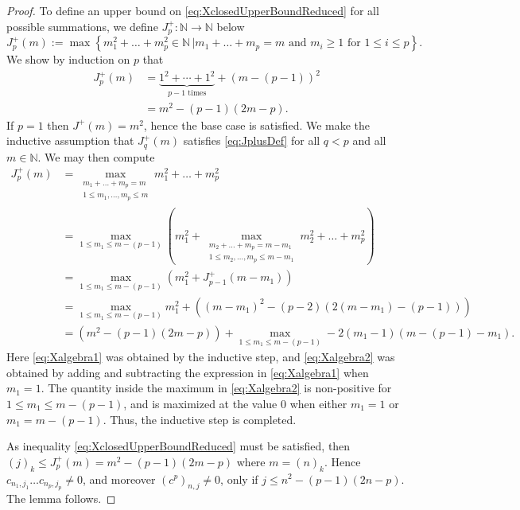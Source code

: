 \documentclass{article}
\newcommand{\N}{\mathbb{N}}
\begin{document}
\begin{proof}
	 To define an upper bound on \eqref{eq:XclosedUpperBoundReduced} for all possible summations, we define   $J^+_p: \N\to \N$  below
	\[
	J^+_p(m) := \max 
	\left\{
	m_1^2  + \dots + m_p^2  \in \N
	\, \Big| 
	m_1 + \dots + m_p = m  \mbox{ and } m_i \geq 1   \mbox{ for } 1 \leq i \leq p
	\right\} .
	\]
	We show by induction on $p$ that
	\begin{align}
J^+_p(m) &= \underbrace{1^2+ \cdots  +1^2}_{p-1 \text{ times} }
+ (m-(p-1))^2
 \nonumber \\
&=m^2 - (p-1)(2m-p) .\label{eq:JplusDef}
	\end{align} 
	If $ p =1$ then $J^+(m) = m^2$, hence the base case is satisfied.  
	We make the inductive assumption that $J^+_q(m)$ satisfies \eqref{eq:JplusDef} for all $ q < p$ and all $ m \in \N$. 
	We may then compute  
\begin{align}
	J_p^+(m) &= \max_{ \substack{m_1 + \dots + m_p =m\\ 1 \leq m_1,\dots , m_p \leq m }} m_1^2 + \dots + m_p^2 
	\nonumber
	\\
		&= 
	\max_{1\leq m_1 \leq m-(p-1) }
	\left( m_1^2 + 
	\max_{\substack{ m_2 + \dots +m_p = m-m_1  \\ 1 \leq m_2 , \dots , m_p \leq m-m_1}}
	m_2^2 + \dots + m_p^2 \right)
	\nonumber
	\\
	&= 
	\max_{1\leq m_1 \leq m-(p-1) }
	\left( m_1^2 + 
	J_{p-1}^+(m-m_1) \right)
	\nonumber
	\\
	&= 
	\max_{1\leq m_1 \leq m-(p-1) } m_1^2 + \left( (m-m_1)^2 -(p-2)( 2(m-m_1) -(p-1)) \right) 
	\label{eq:Xalgebra1}
	\\
	&= \left(
	m^2-(p-1)(2m-p)
	\right) 
	+
	\max_{1\leq m_1 \leq m-(p-1) } 
	-2 (m_1-1)\left( 
	m-(p-1)-m_1
	 \right) .
	 	\label{eq:Xalgebra2}
\end{align}
Here \eqref{eq:Xalgebra1} was obtained by the inductive step,  and \eqref{eq:Xalgebra2} was obtained by adding and subtracting the expression in \eqref{eq:Xalgebra1} when $m_1 = 1$. 
The quantity inside the maximum in \eqref{eq:Xalgebra2} is non-positive for $ 1 \leq m_1 \leq m-(p-1)$, and is maximized at the value $0$ when either $m_1 = 1 $ or $m_1 = m-(p-1)$. Thus, the inductive step is completed. 


As inequality \eqref{eq:XclosedUpperBoundReduced} must be satisfied, then $(j)_k \leq J_p^+(m) = m^2 - (p-1)(2m-p)$ where $m = (n)_k$. 
Hence $	c_{n_1,j_1} \dots c_{n_p , j_p} \neq 0 $, and moreover $ (c^p)_{n,j} \neq 0$,  only if $j \leq n^2 - (p-1)(2n-p)$. 
The lemma follows. 



	 
\end{proof}
\end{document}
